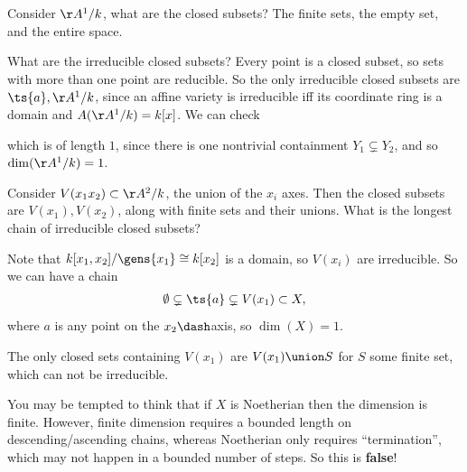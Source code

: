 \begin{example}

Consider \(\AA^1/k\), what are the closed subsets? The finite sets, the
empty set, and the entire space.

What are the irreducible closed subsets? Every point is a closed subset,
so sets with more than one point are reducible. So the only irreducible
closed subsets are \(\ts{a}, \AA^1/k\), since an affine variety is
irreducible iff its coordinate ring is a domain and
\(A(\AA^1/k) = k[x]\). We can check

\begin{center}
\end{center}

which is of length \(1\), since there is one nontrivial containment
\(Y_1 \subsetneq Y_2\), and so \(\dim(\AA^1/k) = 1\).

\end{example}

\begin{example}

Consider \(V(x_1 x_2) \subset \AA^2/k\), the union of the \(x_i\) axes.
Then the closed subsets are \(V(x_1), V(x_2)\), along with finite sets
and their unions. What is the longest chain of irreducible closed
subsets?

Note that \(k[x_1, x_2] / \gens{x_1} \cong k[x_2]\) is a domain, so
\(V(x_i)\) are irreducible. So we can have a chain
\begin{align*}  
\emptyset \subsetneq \ts{a} \subsetneq V(x_1) \subset X
,\end{align*} where \(a\) is any point on the \(x_2\dash\)axis, so
\(\dim(X) = 1\).

The only closed sets containing \(V(x_1)\) are \(V(x_1)\union S\) for
\(S\) some finite set, which can not be irreducible.

\end{example}

\begin{remark}

You may be tempted to think that if \(X\) is Noetherian then the
dimension is finite. However, finite dimension requires a bounded length
on descending/ascending chains, whereas Noetherian only requires
``termination'', which may not happen in a bounded number of steps. So
this is \textbf{false}!

\end{remark}

